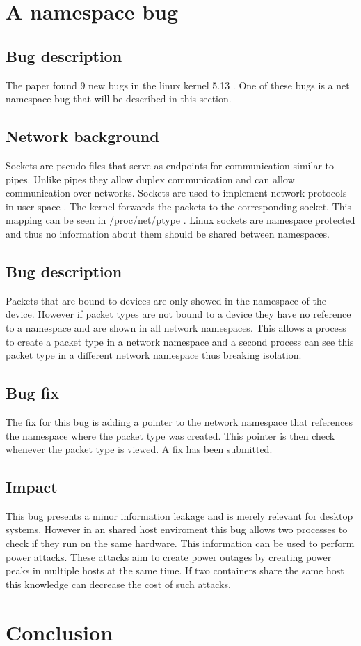 \documentclass[10pt,twocolumn,a4paper]{article}
\begin{document}
\section{A namespace bug}\label{sec:bug}
\subsection{Bug description}
The paper found 9 new bugs in the linux kernel 5.13 \cite{0}. One of these bugs is a net namespace
bug that will be described in this section. 

\subsection{Network background}
Sockets are pseudo files that serve as endpoints for communication similar to pipes. Unlike pipes
they allow duplex communication and can allow communication over networks\cite{5}. Sockets are
used to implement network protocols in user space \cite{5}. The kernel forwards the packets to the
corresponding socket. This mapping can be seen in /proc/net/ptype \cite{6}. Linux sockets are
namespace protected and thus no information about them should be shared between namespaces.

\subsection{Bug description}
Packets that are bound to devices are only showed in the namespace of the device. However if packet
types are not bound to a device they have no reference to a namespace and are shown in all network
namespaces. This allows a process to create a packet type in a network namespace and a second
process can see this packet type in a different network namespace thus breaking isolation.
\subsection{Bug fix}
The fix for this bug is adding a pointer to the network namespace that references the namespace
where the packet type was created. This pointer is then check whenever the packet type is
viewed. A fix has been submitted.\cite{4}
\subsection{Impact}
This bug presents a minor information leakage and is merely relevant for desktop systems.
However in an shared host enviroment this bug allows two processes to check if they run on the same
hardware. This information can be used to perform power attacks. These attacks aim to create power
outages by creating power peaks in multiple hosts at the same time. If two containers share the same
host this knowledge can decrease the cost of such attacks\cite{7}.
\section{Conclusion}\label{sec:conclusion}



\end{document}
